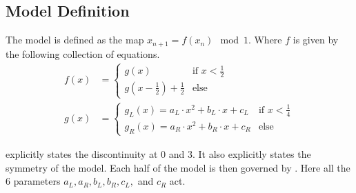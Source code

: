 \subsection{Model Definition}

The model is defined as the map $x_{n+1} = f(x_n) \mod 1$.
Where $f$ is given by the following collection of equations.
\begin{align}
	f(x) & = \begin{cases}
		         g(x)                             & \text{if } x < \frac{1}{2} \\
		         g(x - \frac{1}{2}) + \frac{1}{2} & \text{else}
	         \end{cases} \label{equ:quad.full.f}           \\
	g(x) & = \begin{cases}
		         g_L(x) = a_L \cdot x^2 + b_L \cdot x + c_L & \text{if } x < \frac{1}{4} \\
		         g_R(x) = a_R \cdot x^2 + b_R \cdot x + c_R & \text{else}
	         \end{cases} \label{equ:quad.full.g}
\end{align}

 explicitly states the discontinuity at $0$ and $3$.
It also explicitly states the symmetry of the model.
Each half of the model is then governed by .
Here all the 6 parameters $a_L, a_R, b_L, b_R, c_L,$ and $c_R$ act.

